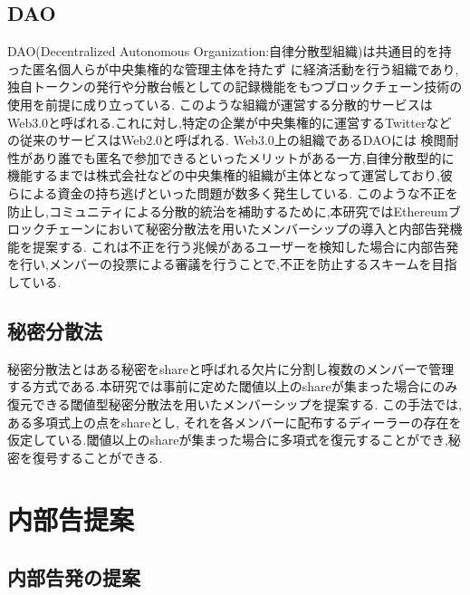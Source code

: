 \documentclass[10pt,a4paper,titlepage]{jarticle}
\begin{document}
\subsection{DAO}
DAO(Decentralized Autonomous Organization:自律分散型組織)は共通目的を持った匿名個人らが中央集権的な管理主体を持たず
に経済活動を行う組織であり, 独自トークンの発行や分散台帳としての記録機能をもつブロックチェーン技術の使用を前提に成り立っている.
このような組織が運営する分散的サービスはWeb3.0と呼ばれる.これに対し,特定の企業が中央集権的に運営するTwitterなどの従来のサービスはWeb2.0と呼ばれる.
Web3.0上の組織であるDAOには 検閲耐性があり誰でも匿名で参加できるといったメリットがある一方,自律分散型的に機能するまでは株式会社などの中央集権的組織が主体となって運営しており,彼らによる資金の持ち逃げといった問題が数多く発生している.
このような不正を防止し,コミュニティによる分散的統治を補助するために,本研究ではEthereumブロックチェーンにおいて秘密分散法を用いたメンバーシップの導入と内部告発機能を提案する.
これは不正を行う兆候があるユーザーを検知した場合に内部告発を行い,メンバーの投票による審議を行うことで,不正を防止するスキームを目指している.
\subsection{秘密分散法}
秘密分散法とはある秘密をshareと呼ばれる欠片に分割し複数のメンバーで管理する方式である.本研究では事前に定めた閾値以上のshareが集まった場合にのみ復元できる閾値型秘密分散法を用いたメンバーシップを提案する.
この手法では, ある多項式上の点をshareとし, それを各メンバーに配布するディーラーの存在を仮定している.閾値以上のshareが集まった場合に多項式を復元することができ,秘密を復号することができる.
\section{内部告提案}
\subsection{内部告発の提案}
\end{document}
